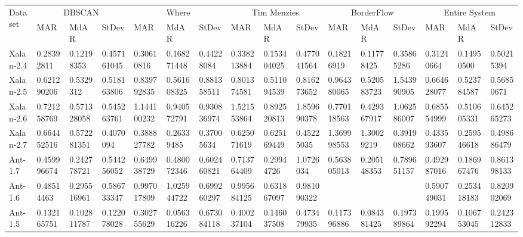 \documentclass[12pt]{report}
\begin{document}
\begin{table}[h]
\label{dimReducedTable}
 \label{results} 
\begin{tabular}{|l|l|l|l|l|l|l|l|l|l|l|l|l|l|l|l|}
\hline
\multirow{2}{*}{Dataset} & \multicolumn{3}{c|}{DBSCAN}                             & \multicolumn{3}{c|}{Where}                                & \multicolumn{3}{c|}{Tim Menzies}                          & \multicolumn{3}{c|}{BorderFlow}                           & \multicolumn{3}{c|}{Entire System}                       \\ \cline{2-16} 
                         & MAR               & MdAR              & StDev           & MAR               & MdAR              & StDev             & MAR               & MdAR              & StDev             & MAR               & MdAR              & StDev             & MAR               & MdAR             & StDev             \\ \hline
Xalan-2.4 & 0.28392811 & 0.12198353 & 0.457161045 & 0.30610816 & 0.168271448 & 0.44228084 & 0.338213884 & 0.153404025 & 0.477041564 & 0.18216919 & 0.11778425 & 0.35865286 & 0.31240664 & 0.14950500 & 0.50215394 \\ \hline
Xalan-2.5  &  0.621290206 &	0.5329312 &	0.518163806 & 0.839792835 &	0.561608325	& 0.881358511 & 0.801374581 &
	0.511094539	& 0.816273652 & 0.964380065 &	0.520583723	&1.543990905 & 0.664628077 &	0.523784587	&0.56850671   \\ \hline
Xalan-2.6  &   0.721258769	&0.571328058	&0.545263761&
1.144100232	&0.940572791	&0.930836974&
1.521553864	&0.892520813	&1.859690378&
0.770118563	&0.429367917	&1.062586007&
0.685554999	&0.510605331	&0.645265273\\ \hline
Xalan-2.7  & 0.664452516&	0.572281351&	0.4070094&
0.388827782&    0.26339485&	0.37005634&
0.625071619&	0.625169449&	0.45225035&
1.369998553&	1.30029219&     0.391908662&
0.433593607&	0.259546618&	0.498686479 \\ \hline
		Ant-1.7 &0.459996674&	0.242778721&	0.544256052&
0.649938729&	0.480072346&	0.602460821&
0.713764409&	0.29944726&	1.0726034&
0.563805013&	0.205148353&	0.789651157&
0.492987016&	0.186967476&	0.861398133		\\ \hline
Ant-1.6&0.48514463&	0.295516961&	0.586733347&
0.997017809&	1.025944722&	0.699260297&
0.995684125&	0.631867097&	0.981090322&
		&&&
0.590749031	&0.253418183&	0.820902069\\ \hline

Ant-1.5 &0.132165751&	0.102811787&	0.122078028
&0.302755629&	0.056316226&	0.673084118
&0.400237104&	0.146037508&	0.473479935
&0.117396886&	0.084381425&	0.197389864
&0.199592294&	0.106753045&	0.242312833\\ \hline


\end{tabular}
\end{table}
\end{document}
